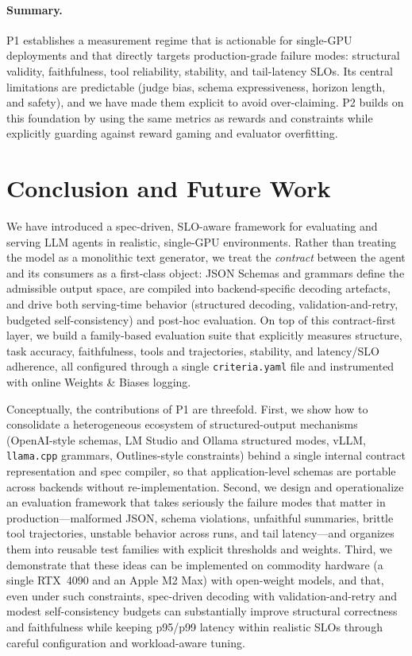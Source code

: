 \paragraph{Summary.}
P1 establishes a measurement regime that is actionable for single-GPU deployments and that directly targets production-grade failure modes: structural validity, faithfulness, tool reliability, stability, and tail-latency SLOs.
Its central limitations are predictable (judge bias, schema expressiveness, horizon length, and safety), and we have made them explicit to avoid over-claiming.
P2 builds on this foundation by using the same metrics as rewards and constraints while explicitly guarding against reward gaming and evaluator overfitting.

\section{Conclusion and Future Work}
\label{sec:conclusion}

We have introduced a spec-driven, SLO-aware framework for evaluating and serving LLM agents in realistic, single-GPU environments.
Rather than treating the model as a monolithic text generator, we treat the \emph{contract} between the agent and its consumers as a first-class object: JSON Schemas and grammars define the admissible output space, are compiled into backend-specific decoding artefacts, and drive both serving-time behavior (structured decoding, validation-and-retry, budgeted self-consistency) and post-hoc evaluation.
On top of this contract-first layer, we build a family-based evaluation suite that explicitly measures structure, task accuracy, faithfulness, tools and trajectories, stability, and latency/SLO adherence, all configured through a single \texttt{criteria.yaml} file and instrumented with online Weights \& Biases logging.

Conceptually, the contributions of P1 are threefold.
First, we show how to consolidate a heterogeneous ecosystem of structured-output mechanisms (OpenAI-style schemas, LM Studio and Ollama structured modes, vLLM, \texttt{llama.cpp} grammars, Outlines-style constraints) behind a single internal contract representation and spec compiler, so that application-level schemas are portable across backends without re-implementation.
Second, we design and operationalize an evaluation framework that takes seriously the failure modes that matter in production---malformed JSON, schema violations, unfaithful summaries, brittle tool trajectories, unstable behavior across runs, and tail latency---and organizes them into reusable test families with explicit thresholds and weights.
Third, we demonstrate that these ideas can be implemented on commodity hardware (a single RTX~4090 and an Apple M2 Max) with open-weight models, and that, even under such constraints, spec-driven decoding with validation-and-retry and modest self-consistency budgets can substantially improve structural correctness and faithfulness while keeping p95/p99 latency within realistic SLOs through careful configuration and workload-aware tuning.

